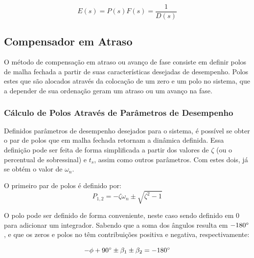 \documentclass[conference,harvard,brazil,english]{sbatex}
\begin{document}
            \begin{equation}
                E(s) = P(s)F(s) =  \frac { 1 } { D(s) }
            \end{equation}
            
        
        \subsection{Compensador em Atraso}
            \label{sub:compensadoratraso}
            
            O método de compensação em atraso ou avanço de fase consiste em definir polos de malha fechada a partir de suas características desejadas de desempenho.
            Polos estes que são alocados através da colocação de um zero e um polo no sistema, que a depender de sua ordenação geram um atraso ou um avanço na fase.
            
            \subsubsection{Cálculo de Polos Através de Parâmetros de Desempenho}
            
                Definidos parâmetros de desempenho desejados para o sistema, é possível se obter o par de polos que em malha fechada retornam a dinâmica definida.
                Essa definição pode ser feita de forma simplificada a partir dos valores de $\zeta$ (ou o percentual de sobressinal) e $t_s$, assim como outros parâmetros. Com estes dois, já se obtém o valor de $\omega_n$.
                
                O primeiro par de polos é definido por:
                \begin{equation}
                    \label{equ:polos12}
                    P_{1,2} = -\zeta \omega_n \pm \sqrt{\zeta^2-1}
                \end{equation}
                
                O polo pode ser definido de forma conveniente, neste caso sendo definido em $0$ para adicionar um integrador. Sabendo que a soma dos ângulos resulta em $-180\degree$, e que os zeros e polos no têm contribuições positiva e negativa, respectivamente:
                
                \begin{equation}
                    \label{equ:contribuicaoangular}
                    - \phi + 90\degree \pm \beta_1 \pm \beta_2 = -180\degree
                \end{equation}
                
\end{document}
